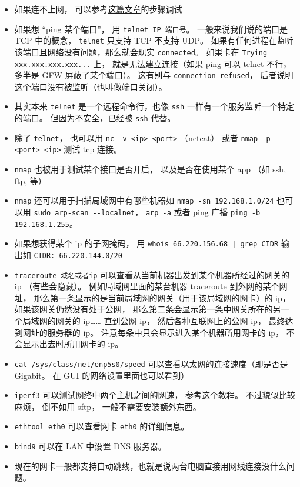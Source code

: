 \begin{itemize}
\item 如果连不上网， 可以参考\href{https://upcloud.com/community/tutorials/troubleshoot-network-connectivity-linux-server/}{这篇文章}的步骤调试
\item 如果想 “ping 某个端口”， 用 \verb|telnet IP 端口号|。 一般来说我们说的端口是 TCP 中的概念， \verb|telnet| 只支持 TCP 不支持 UDP。 如果有任何进程在监听该端口且网络没有问题，那么就会现实 \verb|connected|。 如果卡在 \verb|Trying xxx.xxx.xxx.xxx...| 上， 就是无法建立连接（如果 ping 可以 telnet 不行， 多半是 GFW 屏蔽了某个端口）。 这有别与 \verb|connection refused|， 后者说明这个端口没有被监听（也叫做端口关闭）。
\item 其实本来 \verb|telnet| 是一个远程命令行，也像 \verb|ssh| 一样有一个服务监听一个特定的端口。 但因为不安全，已经被 \verb|ssh| 代替。
\item 除了 \verb|telnet|， 也可以用 \verb|nc -v <ip> <port>| （netcat） 或者 \verb|nmap -p <port> <ip>| 测试 tcp 连接。
\item \verb|nmap| 也被用于测试某个接口是否开启， 以及是否在使用某个 app （如 ssh, ftp, 等）
\item \verb`nmap` 还可以用于扫描局域网中有哪些机器如 \verb`nmap -sn 192.168.1.0/24` 也可以用 \verb`sudo arp-scan --localnet`， \verb`arp -a` 或者 ping 广播 \verb`ping -b 192.168.1.255`。
\item 如果想获得某个 ip 的子网掩码， 用 \verb`whois 66.220.156.68 | grep CIDR` 输出如 \verb|CIDR: 66.220.144.0/20|
\item \verb|traceroute 域名或者ip| 可以查看从当前机器出发到某个机器所经过的网关的 ip （有些会隐藏）。 例如局域网里面的某台机器 traceroute 到外网的某个网址， 那么第一条显示的是当前局域网的网关（用于该局域网的网卡）的 ip， 如果该网关仍然没有处于公网， 那么第二条会显示第一条中网关所在的另一个局域网的网关的 ip…… 直到公网 ip， 然后各种互联网上的公网 ip， 最终达到网址的服务器的 ip。 注意每条中只会显示进入某个机器所用网卡的 ip， 不会显示出去时所用网卡的 ip。
\item \verb|cat /sys/class/net/enp5s0/speed| 可以查看以太网的连接速度（即是否是 Gigabit。 在 GUI 的网络设置里面也可以看到）
\item \verb|iperf3| 可以测试网络中两个主机之间的网速， 参考\href{https://www.cyberciti.biz/faq/how-to-test-the-network-speedthroughput-between-two-linux-servers/}{这个教程}。 不过貌似比较麻烦， 倒不如用 sftp， 一般不需要安装额外东西。
\item \verb|ethtool eth0| 可以查看网卡 \verb|eth0| 的详细信息。
\item \verb|bind9| 可以在 LAN 中设置 DNS 服务器。
\item 现在的网卡一般都支持自动跳线，也就是说两台电脑直接用网线连接没什么问题。
\end{itemize}

